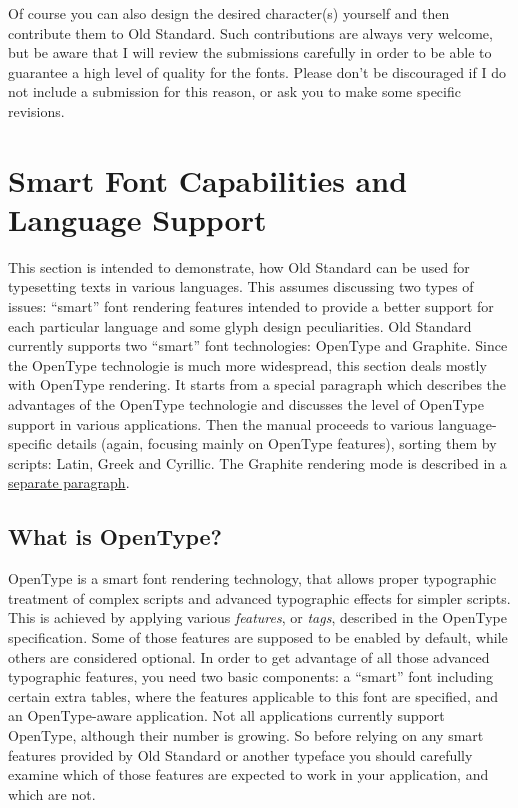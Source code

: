 \documentclass[12pt,a4paper,openany]{book}
\begin{document}
Of course you can also design the desired character(s) yourself and then
contribute them to Old Standard. Such contributions are always very
welcome, but be aware that I will review the submissions carefully in order
to be able to guarantee a high level of quality for the fonts. Please
don’t be discouraged if I do not include a submission for this reason, or
ask you to make some specific revisions.

\section{Smart Font Capabilities and Language Support}

This section is intended to demonstrate, how Old Standard can be used for
typesetting texts in various languages. This assumes discussing two types
of issues: “smart” font rendering features intended to provide a better
support for each particular language and some glyph design peculiarities.
Old Standard currently supports two “smart” font technologies: OpenType
and Graphite. Since the OpenType technologie is much more widespread,
this section deals mostly with OpenType rendering. It starts from a special
paragraph which describes the advantages of the OpenType technologie and
discusses the level of OpenType support in various applications. Then the
manual proceeds to various language-specific details (again, focusing
mainly on OpenType features), sorting them by scripts: Latin, Greek and
Cyrillic. The Graphite rendering mode is described in a
\hyperlink{Graphite}{separate paragraph}.

\subsection{What is OpenType?}
\hypertarget{OT}{}\label{OT}

OpenType is a smart font rendering technology, that allows proper
typographic treatment of complex scripts and advanced typographic effects
for simpler scripts. This is achieved by applying various
\textit{features}, or \textit{tags}, described in the OpenType
specification. Some of those features are supposed to be enabled by
default, while others are considered optional. In order to get advantage of
all those advanced typographic features, you need two basic components: a
“smart” font including certain extra tables, where the features applicable
to this font are specified, and an OpenType-aware application. Not all
applications currently support OpenType, although their number is growing.
So before relying on any smart features provided by Old Standard or another
typeface you should carefully examine which of those features are expected
to work in your application, and which are not.
\end{document}
